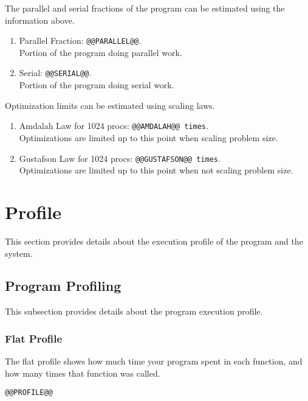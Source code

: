 \documentclass[a4paper]{article}
\begin{document}
The parallel and serial fractions of the program can be estimated using the information above.

\begin{enumerate}
\item Parallel Fraction: {\tt @@PARALLEL@@}.\\Portion of the program doing parallel work.
\item Serial: {\tt @@SERIAL@@}.\\Portion of the program doing serial work.
\end{enumerate}

Optimization limits can be estimated using scaling laws.

\begin{enumerate}
\item Amdalah Law for 1024 procs: {\tt @@AMDALAH@@ times}.\\ Optimizations are limited up to this point when scaling problem size. \cite{amdalah}
\item Gustafson Law for 1024 procs: {\tt @@GUSTAFSON@@ times}.\\ Optimizations are limited up to this point when not scaling problem size. \cite{gustafson}
\end{enumerate}

\section{Profile}

This section provides details about the execution profile of the program and the system.

\subsection{Program Profiling}

This subsection provides details about the program execution profile.


\subsubsection{Flat Profile}

The flat profile shows how much time your program spent in each function, and how many times that function was called.

\begin{verbatim}
@@PROFILE@@
\end{verbatim}
\end{document}
